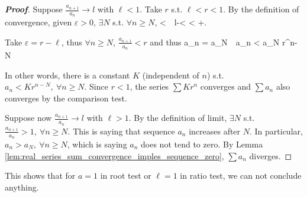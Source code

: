 \begin{proof}[{\bf Proof}]
Suppose $\frac{a_{n+1}}{a_n}\to l$ with $\ell<1$. Take $r$ s.t. $\ell<r<1$. By the definition of convergence, given $\varepsilon>0$, $\exists N$ s.t. $\forall n\geq N$,
\be
{}<\ve \ \ra \ l-\ve <  < \ell+\ve.
\ee

Take $\varepsilon=r-\ell$, thus $\forall n\geq N$, $\frac{a_{n+1}}{a_n} < r$ and thus
\be
a_n = \cdot{}\cdots \cdot {} \cdot a_N\ \ra \ a_n < a_N r^{n-N}
\ee

In other words, there is a constant $K$ (independent of $n$) s.t. $a_n < K r^{n-N}, \ \forall n\geq N$. Since $r<1$, the series $\sum Kr^n$ converges and $\sum a_n$ also converges by the comparison test.

Suppose now $\frac{a_{n+1}}{a_n}\to l$ with $\ell>1$. By the definition of limit, $\exists N$ s.t. $\frac{a_{n+1}}{a_n}>1,\ \forall n\geq N$. This is saying that sequence $a_n$ increases after $N$. In particular, $a_n>a_N,\ \forall n\geq N$, which is saying $a_n$ does not tend to zero. By Lemma \ref{lem:real_series_sum_convergence_imples_sequence_zero}, $\sum a_n$ diverges.
\end{proof}

\begin{remark}
This shows that for $a=1$ in root test or $\ell=1$ in ratio test, we can not conclude anything.
\end{remark}

